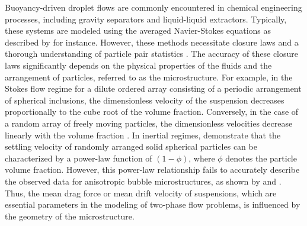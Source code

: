 Buoyancy-driven droplet flows are commonly encountered in chemical engineering processes, including gravity separators and liquid-liquid extractors. Typically, these systems are modeled using the averaged Navier-Stokes equations as described by \citep{castellano2019} for instance. However, these methods necessitate closure laws and a thorough understanding of particle pair statistics \citep{simonin1996}. The accuracy of these closure laws significantly depends on the physical properties of the fluids and the arrangement of particles, referred to as the microstructure. %
For example, in the Stokes flow regime for a dilute ordered array consisting of a periodic arrangement of spherical inclusions, the dimensionless velocity of the suspension decreases proportionally to the cube root of the volume fraction. Conversely, in the case of a random array of freely moving particles, the dimensionless velocities decrease linearly with the volume fraction \citep{saffman1973}. In inertial regimes, \citet{yin2007} demonstrate that the settling velocity of randomly arranged solid spherical particles can be characterized by a power-law function of $(1-\phi)$, where $\phi$ denotes the particle volume fraction. However, this power-law relationship fails to accurately describe the observed data for anisotropic bubble microstructures, as shown by \citet{yin2008lattice} and \citet{loisy2017}. Thus, the mean drag force or mean drift velocity of suspensions, which are essential parameters in the modeling of two-phase flow problems, is influenced by the geometry of the microstructure.





